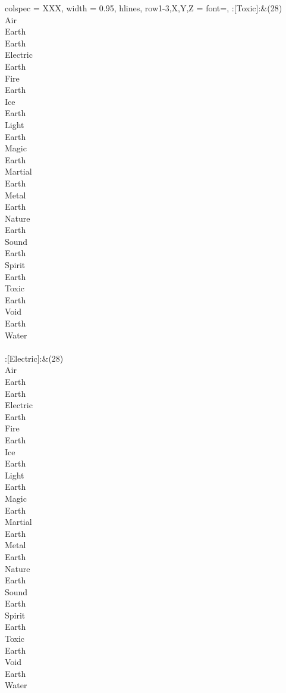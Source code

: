 \begin{longtblr}[
	caption = {2v1 Defending Weak},
	label = {2v1-Defending-Weak},
]{
	colspec = {XXX}, width = 0.95\linewidth,
	hlines,
	row{1-3,X,Y,Z} = {font=\bfseries},
}
	:[Toxic]:&{(28)\\
	Air \\
	Earth \\
	Earth \\
	Electric \\
	Earth \\
	Fire \\
	Earth \\
	Ice \\
	Earth \\
	Light \\
	Earth \\
	Magic \\
	Earth \\
	Martial \\
	Earth \\
	Metal \\
	Earth \\
	Nature \\
	Earth \\
	Sound \\
	Earth \\
	Spirit \\
	Earth \\
	Toxic \\
	Earth \\
	Void \\
	Earth \\
	Water \\
	}\\

	:[Electric]:&{(28)\\
	Air \\
	Earth \\
	Earth \\
	Electric \\
	Earth \\
	Fire \\
	Earth \\
	Ice \\
	Earth \\
	Light \\
	Earth \\
	Magic \\
	Earth \\
	Martial \\
	Earth \\
	Metal \\
	Earth \\
	Nature \\
	Earth \\
	Sound \\
	Earth \\
	Spirit \\
	Earth \\
	Toxic \\
	Earth \\
	Void \\
	Earth \\
	Water \\
	}\\


\end{longtblr}
